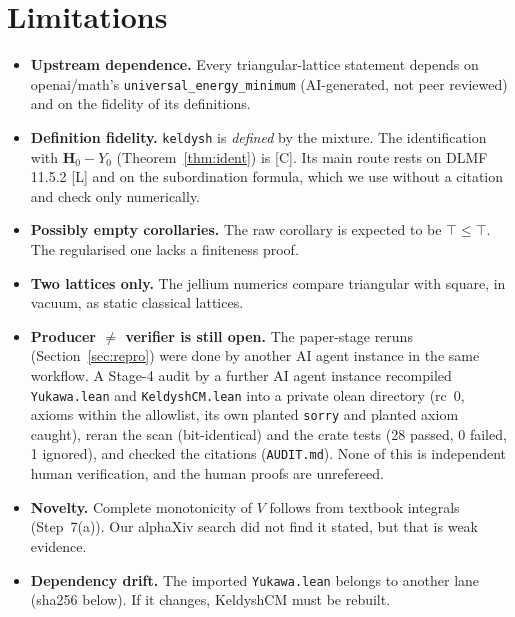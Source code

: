 \documentclass[11pt]{article}
\theoremstyle{remark}
\newcommand{\tier}[1]{\textsf{[#1]}}
\newcommand{\lean}[1]{\texttt{#1}}
\begin{document}
\section{Limitations}\label{sec:lim}
\begin{itemize}
\item \textbf{Upstream dependence.} Every triangular-lattice statement depends on openai/math's
\lean{universal\_energy\_minimum} (AI-generated, not peer reviewed) and on the fidelity of its definitions.
\item \textbf{Definition fidelity.} \lean{keldysh} is \emph{defined} by the mixture. The identification with
$\mathbf H_0-Y_0$ (Theorem~\ref{thm:ident}) is \tier{C}. Its main route rests on DLMF 11.5.2 \tier{L} and on the
subordination formula, which we use without a citation and check only numerically.
\item \textbf{Possibly empty corollaries.} The raw corollary is expected to be $\top\le\top$. The regularised one lacks a
finiteness proof.
\item \textbf{Two lattices only.} The jellium numerics compare triangular with square, in vacuum, as static classical
lattices.
\item \textbf{Producer $\ne$ verifier is still open.} The paper-stage reruns (Section~\ref{sec:repro}) were done by
another AI agent instance in the same workflow. A Stage-4 audit by a further AI agent instance recompiled
\texttt{Yukawa.lean} and \texttt{KeldyshCM.lean} into a private olean directory (rc~0, axioms within the allowlist, its
own planted \lean{sorry} and planted axiom caught), reran the scan (bit-identical) and the crate tests (28 passed, 0
failed, 1 ignored), and checked the citations (\texttt{AUDIT.md}). None of this is independent human verification, and
the human proofs are unrefereed.
\item \textbf{Novelty.} Complete monotonicity of $V$ follows from textbook integrals (Step~7(a)). Our alphaXiv search
did not find it stated, but that is weak evidence.
\item \textbf{Dependency drift.} The imported \texttt{Yukawa.lean} belongs to another lane (sha256 below). If it changes,
KeldyshCM must be rebuilt.
\end{itemize}
\end{document}
